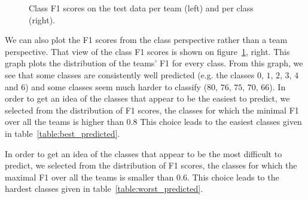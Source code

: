 \documentclass{article}
\begin{document}
\begin{figure}[htbp]
	\begin{center}
		\hspace*{.4in}
	\end{center}
	\caption{\label{fig:class_f1_scores} Class F1 scores on the test data per team (left) and per class (right).}
\end{figure}

We can also plot the F1 scores from the class perspective rather than a team perspective. That view of the class F1 scores is shown on figure~\ref{fig:class_f1_scores}, right. This graph plots the distribution of the teams' F1 for every class. From this graph, we see that some classes are consistently well predicted (e.g. the classes $0$, $1$, $2$, $3$, $4$ and $6$) and some classes seem much harder to classify ($80$, $76$, $75$, $70$, $66$). In order to get an idea of the classes that appear to be the easiest to predict, we selected from the distribution of F1 scores, the classes for which the minimal F1 over all the teams is higher than 0.8 This choice leads to the easiest classes given in table~\ref{table:best_predicted}.



In order to get an idea of the classes that appear to be the most difficult to predict, we selected from the distribution of F1 scores, the classes for which the maximal F1 over all the teams is smaller than 0.6. This choice leads to the hardest classes given in table~\ref{table:worst_predicted}.
\end{document}
